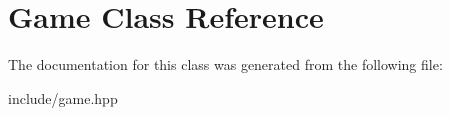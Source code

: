 \hypertarget{class_game}{}\section{Game Class Reference}
\label{class_game}


The documentation for this class was generated from the following file\+:\begin{DoxyCompactItemize}
\item 
include/game.\+hpp\end{DoxyCompactItemize}
